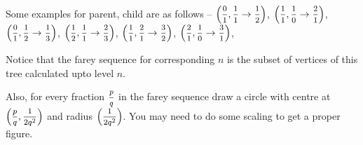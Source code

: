 Some examples for parent, child are as follows -- $\left(\mfrac{0}{1}, \mfrac{1}{1} \rightarrow \mfrac{1}{2}\right)$, $\left(\mfrac{1}{1}, \mfrac{1}{0} \rightarrow \mfrac{2}{1}\right)$, $\left(\mfrac{0}{1}, \mfrac{1}{2} \rightarrow \mfrac{1}{3}\right)$, $\left(\mfrac{1}{2}, \mfrac{1}{1} \rightarrow \mfrac{2}{3}\right)$, $\left(\mfrac{1}{1}, \mfrac{2}{1} \rightarrow \mfrac{3}{2}\right)$, $\left(\mfrac{2}{1}, \mfrac{1}{0} \rightarrow \mfrac{3}{1}\right)$,

Notice that the farey sequence for corresponding $n$ is the subset of vertices of this tree calculated upto level $n$.

Also, for every fraction $\mfrac{p}{q}$ in the farey sequence draw a circle with centre at $\left(\mfrac{p}{q}, \mfrac{1}{2q^2}\right)$ and radius $\left(\mfrac{1}{2q^2}\right)$. You may need to do some scaling to get a proper figure.

